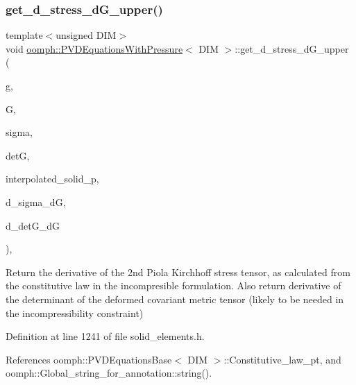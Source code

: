 \subsubsection{\texorpdfstring{get\+\_\+d\+\_\+stress\+\_\+d\+G\+\_\+upper()}{get\_d\_stress\_dG\_upper()}\hspace{0.1cm}{\footnotesize\ttfamily [2/2]}}
{\footnotesize\ttfamily template$<$unsigned D\+IM$>$ \\
void \hyperlink{classoomph_1_1PVDEquationsWithPressure}{oomph\+::\+P\+V\+D\+Equations\+With\+Pressure}$<$ D\+IM $>$\+::get\+\_\+d\+\_\+stress\+\_\+d\+G\+\_\+upper (\begin{DoxyParamCaption}\item[{const \hyperlink{classoomph_1_1DenseMatrix}{Dense\+Matrix}$<$ double $>$ \&}]{g,  }\item[{const \hyperlink{classoomph_1_1DenseMatrix}{Dense\+Matrix}$<$ double $>$ \&}]{G,  }\item[{const \hyperlink{classoomph_1_1DenseMatrix}{Dense\+Matrix}$<$ double $>$ \&}]{sigma,  }\item[{const double \&}]{detG,  }\item[{const double \&}]{interpolated\+\_\+solid\+\_\+p,  }\item[{\hyperlink{classoomph_1_1RankFourTensor}{Rank\+Four\+Tensor}$<$ double $>$ \&}]{d\+\_\+sigma\+\_\+dG,  }\item[{\hyperlink{classoomph_1_1DenseMatrix}{Dense\+Matrix}$<$ double $>$ \&}]{d\+\_\+det\+G\+\_\+dG }\end{DoxyParamCaption})\hspace{0.3cm}{\ttfamily [inline]}, {\ttfamily [protected]}}



Return the derivative of the 2nd Piola Kirchhoff stress tensor, as calculated from the constitutive law in the incompresible formulation. Also return derivative of the determinant of the deformed covariant metric tensor (likely to be needed in the incompressibility constraint) 



Definition at line 1241 of file solid\+\_\+elements.\+h.



References oomph\+::\+P\+V\+D\+Equations\+Base$<$ D\+I\+M $>$\+::\+Constitutive\+\_\+law\+\_\+pt, and oomph\+::\+Global\+\_\+string\+\_\+for\+\_\+annotation\+::string().

\mbox{\label{classoomph_1_1PVDEquationsWithPressure_a46331a93e6ac8cff7b4badad1c7a7a03}} 
